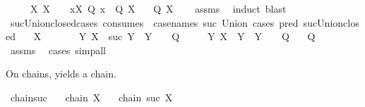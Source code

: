 \begin{isabellebody}
\ \ \ \ \ {\isachardoublequoteopen}{\isasymAnd}X{\isachardot}{\kern0pt}\ X\ {\isasymsubseteq}\ {\isasymC}\ {\isasymLongrightarrow}\ {\isasymforall}x{\isasymin}X{\isachardot}{\kern0pt}\ Q\ x\ {\isasymLongrightarrow}\ Q\ {\isacharparenleft}{\kern0pt}{\isasymUnion}X{\isacharparenright}{\kern0pt}{\isachardoublequoteclose}\isanewline
\ \ \ {\isachardoublequoteopen}Q\ X{\isachardoublequoteclose}\isanewline
%
\isadelimproof
\ \ %
\endisadelimproof
%
\isatagproof
{}\isamarkupfalse%
\ assms\ \isamarkupfalse%
\ induct\ blast{\isacharplus}{\kern0pt}%
\endisatagproof
{\isafoldproof}%
%
\isadelimproof
\isanewline
%
\endisadelimproof
\isanewline
{}\isamarkupfalse%
\ suc{\isacharunderscore}{\kern0pt}Union{\isacharunderscore}{\kern0pt}closed{\isacharunderscore}{\kern0pt}cases\ {\isacharbrackleft}{\kern0pt}consumes\ {}{\isacharcomma}{\kern0pt}\ case{\isacharunderscore}{\kern0pt}names\ suc\ Union{\isacharcomma}{\kern0pt}\ cases\ pred{\isacharcolon}{\kern0pt}\ suc{\isacharunderscore}{\kern0pt}Union{\isacharunderscore}{\kern0pt}closed{\isacharbrackright}{\kern0pt}{\isacharcolon}{\kern0pt}\isanewline
\ \ \ {\isachardoublequoteopen}X\ {\isasymin}\ {\isasymC}{\isachardoublequoteclose}\isanewline
\ \ \ \ \ {\isachardoublequoteopen}{\isasymAnd}Y{\isachardot}{\kern0pt}\ X\ {\isacharequal}{\kern0pt}\ suc\ Y\ {\isasymLongrightarrow}\ Y\ {\isasymin}\ {\isasymC}\ {\isasymLongrightarrow}\ Q{\isachardoublequoteclose}\isanewline
\ \ \ \ \ {\isachardoublequoteopen}{\isasymAnd}Y{\isachardot}{\kern0pt}\ X\ {\isacharequal}{\kern0pt}\ {\isasymUnion}Y\ {\isasymLongrightarrow}\ Y\ {\isasymsubseteq}\ {\isasymC}\ {\isasymLongrightarrow}\ Q{\isachardoublequoteclose}\isanewline
\ \ \ {\isachardoublequoteopen}Q{\isachardoublequoteclose}\isanewline
%
\isadelimproof
\ \ %
\endisadelimproof
%
\isatagproof
{}\isamarkupfalse%
\ assms\ \isamarkupfalse%
\ cases\ simp{\isacharunderscore}{\kern0pt}all%
\endisatagproof
{\isafoldproof}%
%
\isadelimproof
%
\endisadelimproof
%
\begin{isamarkuptext}%
On chains,  yields a chain.%
\end{isamarkuptext}\isamarkuptrue%
\isamarkupfalse%
\ chain{\isacharunderscore}{\kern0pt}suc{\isacharcolon}{\kern0pt}\isanewline
\ \ \ {\isachardoublequoteopen}chain\ X{\isachardoublequoteclose}\isanewline
\ \ \ {\isachardoublequoteopen}chain\ {\isacharparenleft}{\kern0pt}suc\ X{\isacharparenright}{\kern0pt}{\isachardoublequoteclose}\isanewline

\end{isabellebody}
